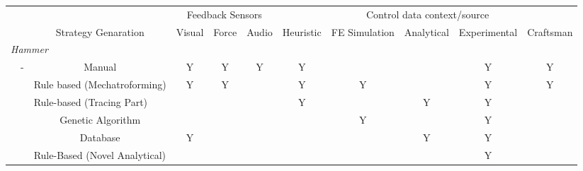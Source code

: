 \begin{tabular}{ccccccccccc} \toprule
               &                                                                                                         & \multicolumn{1}{c}{}             & \multicolumn{3}{c}{Feedback Sensors}    & \multicolumn{5}{c}{Control data   context/source}                 \\
\cmidrule(lr){4-6}\cmidrule(lr){7-11}
               &                                                                                                 & Strategy Genaration              & Visual         & Force      & Audio     & Heuristic & FE Simulation & Analytical & Experimental & Craftsman \\
\midrule
\multicolumn{11}{l}{\textit{Hammer}} \\
			   & -                                                                                                               & Manual                           & Y              & Y          & Y         & Y         &               &            & Y            & Y         \\
               & \citep{Ilangovan2016AnForming}                                                                                  & Rule based (Mechatroforming)     & Y              & Y          &           & Y         & Y             &            & Y            & Y         \\
               & \citep{Tanaka2005DevelopmentWorking,Asakawa2010DevelopmentProcess,Takasugi2012DevelopmentShape}                 & \multicolumn{2}{l}{Rule-based (Tracing Part)}     &            &           & Y         &               & Y          & Y            &           \\
               & \citep{Mori1996DeterminationAlgorithm}                                                                          & Genetic Algorithm                &                &            &           &           & Y             &            & Y            &           \\
               & \citep{Mori1998IncrementalDatabase}                                                                             & Database                         & Y              &            &           &           &               & Y          & Y            &           \\
               & \citep{Wang2017IncrementalPath,Zhu2019ToolForming,Schafer2005IncrementalRobots,Puzik2008IncrementalApplication} & \multicolumn{2}{l}{Rule-Based (Novel Analytical)} &            &           &           &               &            & Y            &           \\

\end{tabular}
